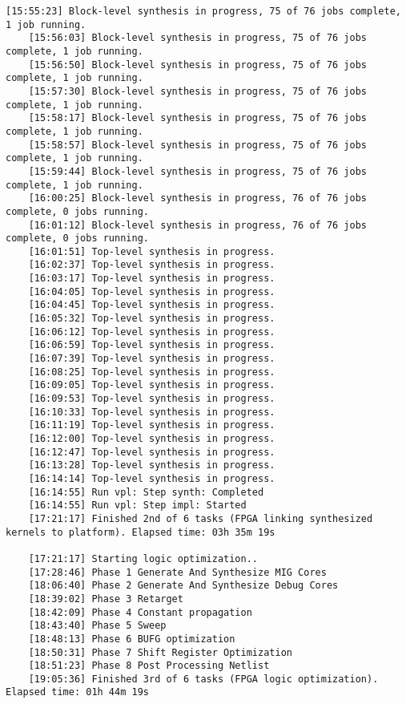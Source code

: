 \begin{lstlisting}[caption=Содержимое файла v++\_vinc.log, label={log1}]
	[15:55:23] Block-level synthesis in progress, 75 of 76 jobs complete, 1 job running.
	[15:56:03] Block-level synthesis in progress, 75 of 76 jobs complete, 1 job running.
	[15:56:50] Block-level synthesis in progress, 75 of 76 jobs complete, 1 job running.
	[15:57:30] Block-level synthesis in progress, 75 of 76 jobs complete, 1 job running.
	[15:58:17] Block-level synthesis in progress, 75 of 76 jobs complete, 1 job running.
	[15:58:57] Block-level synthesis in progress, 75 of 76 jobs complete, 1 job running.
	[15:59:44] Block-level synthesis in progress, 75 of 76 jobs complete, 1 job running.
	[16:00:25] Block-level synthesis in progress, 76 of 76 jobs complete, 0 jobs running.
	[16:01:12] Block-level synthesis in progress, 76 of 76 jobs complete, 0 jobs running.
	[16:01:51] Top-level synthesis in progress.
	[16:02:37] Top-level synthesis in progress.
	[16:03:17] Top-level synthesis in progress.
	[16:04:05] Top-level synthesis in progress.
	[16:04:45] Top-level synthesis in progress.
	[16:05:32] Top-level synthesis in progress.
	[16:06:12] Top-level synthesis in progress.
	[16:06:59] Top-level synthesis in progress.
	[16:07:39] Top-level synthesis in progress.
	[16:08:25] Top-level synthesis in progress.
	[16:09:05] Top-level synthesis in progress.
	[16:09:53] Top-level synthesis in progress.
	[16:10:33] Top-level synthesis in progress.
	[16:11:19] Top-level synthesis in progress.
	[16:12:00] Top-level synthesis in progress.
	[16:12:47] Top-level synthesis in progress.
	[16:13:28] Top-level synthesis in progress.
	[16:14:14] Top-level synthesis in progress.
	[16:14:55] Run vpl: Step synth: Completed
	[16:14:55] Run vpl: Step impl: Started
	[17:21:17] Finished 2nd of 6 tasks (FPGA linking synthesized kernels to platform). Elapsed time: 03h 35m 19s 
	
	[17:21:17] Starting logic optimization..
	[17:28:46] Phase 1 Generate And Synthesize MIG Cores
	[18:06:40] Phase 2 Generate And Synthesize Debug Cores
	[18:39:02] Phase 3 Retarget
	[18:42:09] Phase 4 Constant propagation
	[18:43:40] Phase 5 Sweep
	[18:48:13] Phase 6 BUFG optimization
	[18:50:31] Phase 7 Shift Register Optimization
	[18:51:23] Phase 8 Post Processing Netlist
	[19:05:36] Finished 3rd of 6 tasks (FPGA logic optimization). Elapsed time: 01h 44m 19s 
	

\end{lstlisting}
